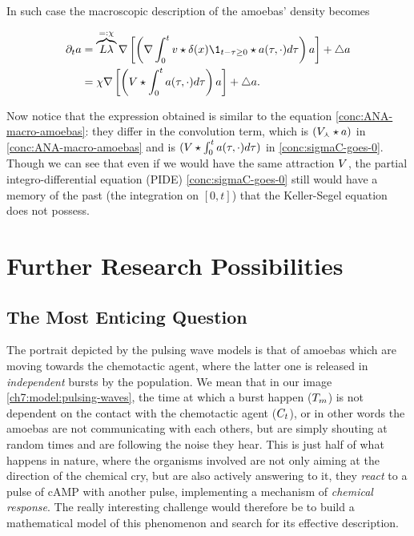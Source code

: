 In such case the macroscopic description of the amoebas' density becomes

\begin{equation}\label{conc:sigmaC-goes-0}
	\begin{aligned}
		\partial_t \adens &=  \overbrace{
			\NumCampRelease\lambda
		}^{=:\chi}
		\nabla \left[ \left( \nabla \int_0^t
		\potential \star 
		\delta(x) \1_{t-\tau\geq 0}
		\star \adens(\tau, \cdot) 
		d \tau
		\right)
		\adens
		\right]
		+
		\bigtriangleup \adens
		\\
		&=
		\chi 
		\nabla \left[ \left( 
		\attraction
		\star 
		\int_0^t
		\adens(\tau, \cdot) 
		d \tau
		\right)
		\adens
		\right]
		+
		\bigtriangleup \adens.
	\end{aligned}
\end{equation}

Now notice that the expression obtained is similar to the equation \ref{conc:ANA-macro-amoebas}: they differ in the convolution term, which is $(V_\curlywedge \star a)$ in \ref{conc:ANA-macro-amoebas} and is $(V \star \int_0^t a(\tau, \cdot) d\tau)$ in \ref{conc:sigmaC-goes-0}.
Though we can see that even if we would have the same attraction $V$, the partial integro-differential equation (PIDE) \ref{conc:sigmaC-goes-0} still would have a memory of the past (the integration on $[0,t]$) that the Keller-Segel equation does not possess.

\section{Further Research Possibilities}

\subsection{The Most Enticing Question}

The portrait depicted by the pulsing wave models is that of amoebas which are moving towards the chemotactic agent, where the latter one is released in \emph{independent} bursts by the population.
We mean that in our image \ref{ch7:model:pulsing-waves}, the time at which a burst happen ($T_m$) is not dependent on the contact with the chemotactic agent ($C_t$), or in other words the amoebas are not communicating with each others, but are simply shouting at random times and are following the noise they hear.
This is just half of what happens in nature, where the organisms involved are not only aiming at the direction of the chemical cry, but are also actively answering to it, \ie they \emph{react} to a pulse of cAMP with another pulse, implementing a mechanism of \emph{chemical response}.
The really interesting challenge would therefore be to build a mathematical model of this phenomenon and search for its effective description.

